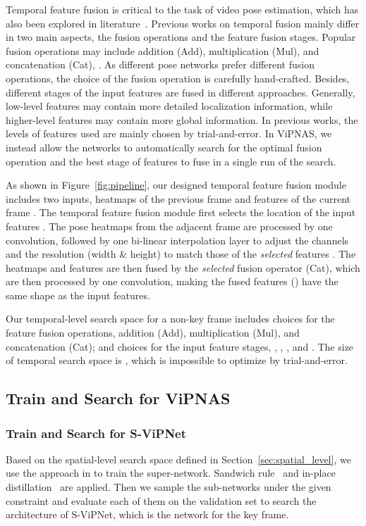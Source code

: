 \documentclass[final]{cvpr}
\begin{document}
Temporal feature fusion is critical to the task of video pose estimation, which has also been explored in literature~\cite{gkioxari2016chained,lihh2019temporal,liwt2019temporal,luo2018lstm,nie2019dynamic}. Previous works on temporal fusion mainly differ in two main aspects, \ie the fusion operations and the feature fusion stages. Popular fusion operations may include addition (Add), multiplication (Mul), and concatenation (Cat), \etc. As different pose networks prefer different fusion operations, the choice of the fusion operation is carefully hand-crafted. Besides, different stages of the input features are fused in different approaches. Generally, low-level features may contain more detailed localization information, while higher-level features may contain more global information. In previous works, the levels of features used are mainly chosen by trial-and-error. In ViPNAS, we instead allow the networks to automatically search for the optimal fusion operation and the best stage of features to fuse in a single run of the search. 

As shown in Figure~\ref{fig:pipeline}, our designed temporal feature fusion module includes two inputs, \ie heatmaps of the previous frame and features of the current frame . The temporal feature fusion module first selects the location of the input features . The pose heatmaps from the adjacent frame are processed by one  convolution, followed by one bi-linear interpolation layer to adjust the channels and the resolution (width \& height) to match those of the \emph{selected} features . The heatmaps and features are then fused by the \emph{selected} fusion operator (Cat), which are then processed by one  convolution, making the fused features () have the same shape as the input features. 

Our temporal-level search space for a non-key frame includes  choices for the feature fusion operations, \eg addition (Add), multiplication (Mul), and concatenation (Cat); and  choices for the input feature stages, \eg , , , and . The size of temporal search space is , which is impossible to optimize by trial-and-error.


\subsection{Train and Search for ViPNAS}


\subsubsection{Train and Search for S-ViPNet}
Based on the spatial-level search space defined in Section~\ref{sec:spatial_level}, we use the approach in \cite{yu2020bignas} to train the super-network. Sandwich rule~\cite{yu2019universally,yu2020bignas} and in-place distillation~\cite{yu2019universally,yu2020bignas} are applied. Then we sample the sub-networks under the given constraint and evaluate each of them on the validation set to search the architecture of S-ViPNet, which is the network for the key frame. 
\end{document}
